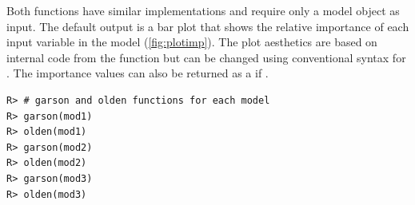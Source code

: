 \documentclass[article,shortnames]{jss}\usepackage[]{graphicx}\usepackage[]{color}
\makeatletter
\newenvironment{kframe}{%
 \def\at@end@of@kframe{}%
 \ifinner\ifhmode%
  \def\at@end@of@kframe{\end{minipage}}%
  \begin{minipage}{\columnwidth}%
 \fi\fi%
 \def\FrameCommand##1{\hskip\@totalleftmargin \hskip-\fboxsep
 \colorbox{shadecolor}{##1}\hskip-\fboxsep
     \hskip-\linewidth \hskip-\@totalleftmargin \hskip\columnwidth}%
 \MakeFramed {\advance\hsize-\width
   \@totalleftmargin\z@ \linewidth\hsize
   \@setminipage}}%
 {\par\unskip\endMakeFramed%
 \at@end@of@kframe}
\newenvironment{knitrout}{}{} %
\makeatother
\begin{document}
Both functions have similar implementations and require only a model object as input.  The default output is a  bar plot \citep[i.e., ,][]{Wickham09} that shows the relative importance of each input variable in the model (\cref{fig:plotimp}).  The plot aesthetics are based on internal code from the function but can be changed using conventional syntax for .  The importance values can also be returned as a  if .  

\begin{knitrout}
\color{fgcolor}\begin{kframe}
\begin{verbatim}
R> # garson and olden functions for each model
R> garson(mod1)
R> olden(mod1)
R> garson(mod2)
R> olden(mod2)
R> garson(mod3)
R> olden(mod3)
\end{verbatim}
\end{kframe}
\end{knitrout}
\end{document}
